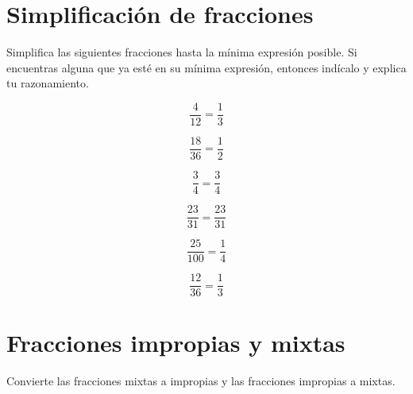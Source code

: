 \documentclass[11pt]{article}
\begin{document}
\vspace{1cm}  

\section{Simplificaci\'on de fracciones}
Simplifica las siguientes fracciones hasta la m\'inima expresi\'on posible. Si
encuentras alguna que ya est\'e en su m\'inima expresi\'on, entonces ind\'icalo
y explica tu razonamiento.

\begin{multicols}{2}

\begin{equation}    \frac{4}{12}=\frac{1}{3}   \nonumber\end{equation}

\begin{equation}    \frac{18}{36}=\frac{1}{2}  \nonumber\end{equation}

\begin{equation}    \frac{3}{4}=\frac{3}{4}    \nonumber\end{equation}

\begin{equation}    \frac{23}{31}=\frac{23}{31}\nonumber\end{equation}

\begin{equation}    \frac{25}{100}=\frac{1}{4} \nonumber\end{equation}

\begin{equation}    \frac{12}{36}=\frac{1}{3}  \nonumber\end{equation}

\end{multicols}

\vspace{1cm}

\section{Fracciones impropias y mixtas}
Convierte las fracciones mixtas a impropias y las fracciones impropias a mixtas.
\end{document}
